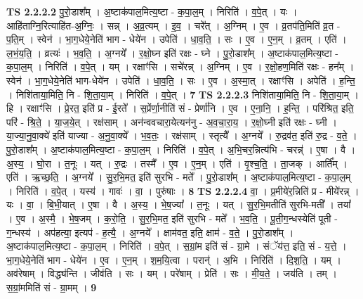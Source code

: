 \documentclass[17pt]{extarticle}
\begin{document}
                  \newline
                                \textbf{ TS 2.2.2.2} \newline
                  पु॒रो॒डाश᳚म् । अ॒ष्टाक॑पाल॒मित्य॒ष्टा - क॒पा॒ल॒म् । निरिति॑ । व॒पे॒त् । यः । आहि॑ताग्नि॒रित्याहि॑त-अ॒ग्निः॒ । सन्न् । अ॒व्र॒त्यम् । इ॒व॒ । चरे᳚त् । अ॒ग्निम् । ए॒व । व्र॒तप॑ति॒मिति॑ व्र॒त - प॒ति॒म् । स्वेन॑ । भा॒ग॒धेये॒नेति॑ भाग - धेये॑न । उपेति॑ । धा॒व॒ति॒ । सः । ए॒व । ए॒न॒म् । व्र॒तम् । एति॑ । ल॒भं॒य॒ति॒ । व्रत्यः॑ । भ॒व॒ति॒ । अ॒ग्नये᳚ । र॒क्षो॒घ्न इति॑ रक्षः - घ्ने । पु॒रो॒डाश᳚म् । अ॒ष्टाक॑पाल॒मित्य॒ष्टा - क॒पा॒ल॒म् । निरिति॑ । व॒पे॒त् । यम् । रक्षाꣳ॑सि । सचे॑रन्न् । अ॒ग्निम् । ए॒व । र॒क्षो॒हण॒मिति॑ रक्षः - हन᳚म् । स्वेन॑ । भा॒ग॒धेये॒नेति॑ भाग-धेये॑न । उपेति॑ । धा॒व॒ति॒ । सः । ए॒व । अ॒स्मा॒त् । रक्षाꣳ॑सि । अपेति॑ । ह॒न्ति॒ । निशि॑ताया॒मिति॒ नि - शि॒ता॒या॒म् । निरिति॑ । व॒पे॒त् । \textbf{  7} \newline
                  \newline
                                \textbf{ TS 2.2.2.3} \newline
                  निशि॑ताया॒मिति॒ नि - शि॒ता॒या॒म् । हि । रक्षाꣳ॑सि । प्रे॒रत॒ इति॑ प्र - ई॒रते᳚ । स॒प्रेंर्णा॒नीति॑ सं - प्रेर्णा॑नि । ए॒व । ए॒ना॒नि॒ । ह॒न्ति॒ । परि॑श्रित॒ इति॒ परि॑ - श्रि॒ते॒ । या॒ज॒ये॒त् । रक्ष॑साम् । अन॑न्ववचारा॒येत्यन॑नु - अ॒व॒चा॒रा॒य॒ । र॒क्षो॒घ्नी इति॑ रक्षः - घ्नी । या॒ज्या॒नु॒वा॒क्ये॑ इति॑ याज्या - अ॒नु॒वा॒क्ये᳚ । भ॒व॒तः॒ । रक्ष॑साम् । स्तृत्यै᳚ । अ॒ग्नये᳚ । रु॒द्रव॑त॒ इति॑ रु॒द्र - व॒ते॒ । पु॒रो॒डाश᳚म् । अ॒ष्टाक॑पाल॒मित्य॒ष्टा - क॒पा॒ल॒म् । निरिति॑ । व॒पे॒त् । अ॒भि॒चर॒न्नित्य॑भि - चरन्न्॑ । ए॒षा । वै । अ॒स्य॒ । घो॒रा । त॒नूः । यत् । रु॒द्रः । तस्मै᳚ । ए॒व । ए॒न॒म् । एति॑ । वृ॒श्च॒ति॒ । ता॒जक् । आर्ति᳚म् । एति॑ । ऋ॒च्छ॒ति॒ । अ॒ग्नये᳚ । सु॒र॒भि॒मत॒ इति॑ सुरभि - मते᳚ । पु॒रो॒डाश᳚म् । अ॒ष्टाक॑पाल॒मित्य॒ष्टा - क॒पा॒ल॒म् । निरिति॑ । व॒पे॒त् । यस्य॑ । गावः॑ । वा॒ । पुरु॑षाः । \textbf{  8} \newline
                  \newline
                                \textbf{ TS 2.2.2.4} \newline
                  वा॒ । प्र॒मीये॑र॒न्निति॑ प्र - मीये॑रन्न् । यः । वा॒ । बि॒भी॒यात् । ए॒षा । वै । अ॒स्य॒ । भे॒ष॒ज्या᳚ । त॒नूः । यत् । सु॒र॒भि॒मतीति॑ सुरभि-मती᳚ । तया᳚ । ए॒व । अ॒स्मै॒ । भे॒ष॒जम् । क॒रो॒ति॒ । सु॒र॒भि॒मत॒ इति॑ सुरभि - मते᳚ । भ॒व॒ति॒ । पू॒ती॒ग॒न्धस्येति॑ पूती - ग॒न्धस्य॑ । अप॑हत्या॒ इत्यप॑ - ह॒त्यै॒ । अ॒ग्नये᳚ । क्षाम॑वत॒ इति॒ क्षाम॑ - व॒ते॒ । पु॒रो॒डाश᳚म् । अ॒ष्टाक॑पाल॒मित्य॒ष्टा - क॒पा॒ल॒म् । निरिति॑ । व॒पे॒त् । स॒ग्रां॒म इति॑ सं - ग्रा॒मे । संॅय॑त्त॒ इति॒ सं - य॒त्ते॒ । भा॒ग॒धेये॒नेति॑ भाग - धेये॑न । ए॒व । ए॒न॒म् । श॒म॒यि॒त्वा । परान्॑ । अ॒भि । निरिति॑ । दि॒श॒ति॒ । यम् । अव॑रेषाम् । विद्ध्य॑न्ति । जीव॑ति । सः । यम् । परे॑षाम् । प्रेति॑ । सः । मी॒य॒ते॒ । जय॑ति । तम् । स॒ग्रां॒ममिति॑ सं - ग्रा॒मम् । \textbf{  9} \newline
\end{document}
